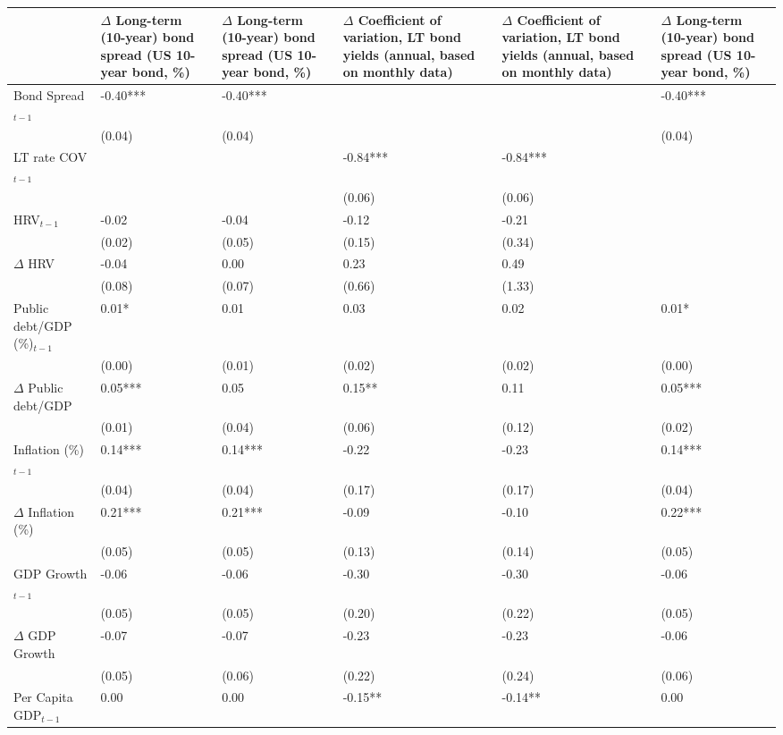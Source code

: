 \begingroup\tiny
\begin{tabular}{lp{3cm}p{3cm}p{3cm}p{3cm}p{3cm}}
  \hline
 & $\Delta$ Long-term (10-year) bond spread (US 10-year bond, \%) & $\Delta$ Long-term (10-year) bond spread (US 10-year bond, \%) & $\Delta$ Coefficient of variation, LT bond yields (annual, based on monthly data) & $\Delta$ Coefficient of variation, LT bond yields (annual, based on monthly data) & $\Delta$ Long-term (10-year) bond spread (US 10-year bond, \%) \\ 
  \hline
Bond Spread$_{t-1}$ & -0.40*** & -0.40*** &  &  & -0.40*** \\ 
   & (0.04) & (0.04) &  &  & (0.04) \\ 
  LT rate COV$_{t-1}$ &  &  & -0.84*** & -0.84*** &  \\ 
   &  &  & (0.06) & (0.06) &  \\ 
  HRV$_{t-1}$ & -0.02 & -0.04 & -0.12 & -0.21 &  \\ 
   & (0.02) & (0.05) & (0.15) & (0.34) &  \\ 
  $\Delta$ HRV & -0.04 & 0.00 & 0.23 & 0.49 &  \\ 
   & (0.08) & (0.07) & (0.66) & (1.33) &  \\ 
  Public debt/GDP (\%)$_{t-1}$ & 0.01* & 0.01 & 0.03 & 0.02 & 0.01* \\ 
   & (0.00) & (0.01) & (0.02) & (0.02) & (0.00) \\ 
  $\Delta$ Public debt/GDP & 0.05*** & 0.05 & 0.15** & 0.11 & 0.05*** \\ 
   & (0.01) & (0.04) & (0.06) & (0.12) & (0.02) \\ 
  Inflation (\%) $_{t-1}$ & 0.14*** & 0.14*** & -0.22 & -0.23 & 0.14*** \\ 
   & (0.04) & (0.04) & (0.17) & (0.17) & (0.04) \\ 
  $\Delta$ Inflation (\%) & 0.21*** & 0.21*** & -0.09 & -0.10 & 0.22*** \\ 
   & (0.05) & (0.05) & (0.13) & (0.14) & (0.05) \\ 
  GDP Growth$_{t-1}$ & -0.06 & -0.06 & -0.30 & -0.30 & -0.06 \\ 
   & (0.05) & (0.05) & (0.20) & (0.22) & (0.05) \\ 
  $\Delta$ GDP Growth & -0.07 & -0.07 & -0.23 & -0.23 & -0.06 \\ 
   & (0.05) & (0.06) & (0.22) & (0.24) & (0.06) \\ 
  Per Capita GDP$_{t-1}$ & 0.00 & 0.00 & -0.15** & -0.14** & 0.00 \\ 

\end{tabular}
